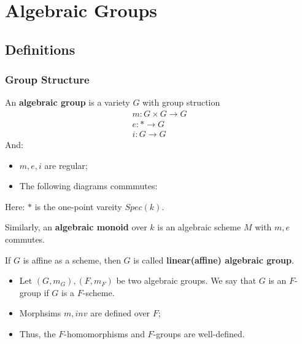 \documentclass[Total.tex]{subfiles}
\begin{document}
	\chapter{Algebraic Groups}
		\section{Definitions}
			\subsection{Group Structure}
			\begin{Def}
				An \textbf{algebraic group} is a variety $G$ with group struction
				\begin{gather*}
					m:G\times G\rightarrow G\\
					e:*\rightarrow G\\
					i:G\rightarrow G
				\end{gather*}
				And:
				\begin{itemize}
					\item $m,e,i$ are regular;
					\item The following diagrams commmutes:
					\begin{center}
					\end{center}
				\end{itemize}
				Here: $*$ is the one-point vareity $Spec(k)$.
				
				Similarly, an \textbf{algebraic monoid} over $k$ is an algebraic scheme $M$ with $m,e$ commutes.
			\end{Def}
			If $G$ is affine as a scheme, then $G$ is called \textbf{linear(affine) algebraic group}.
			\begin{Def}
				\begin{itemize}
					\item Let $(G,m_G),(F,m_F)$ be two algebraic groups. We say that $G$ is an $F$-group if $G$ is a $F$-scheme.
					\item Morphsims $m,inv$ are defined over $F$;
					\item Thus, the $F$-homomorphisms and $F$-groups are well-defined.
				\end{itemize}
			\end{Def}
			
\end{document}
